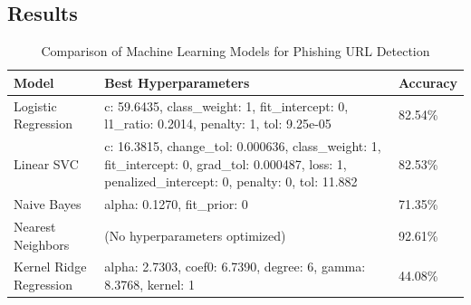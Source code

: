 \documentclass{article}
\begin{document}
    \subsection{Results}\label{subsec:results}


    \begin{table}[H]
        \centering
        \begin{tabular}{|l|p{8cm}|l|}
            \hline
            \textbf{Model}          & \textbf{Best Hyperparameters}                                                                                                                          & \textbf{Accuracy} \\ \hline
            Logistic Regression     & c: 59.6435, class\_weight: 1, fit\_intercept: 0, l1\_ratio: 0.2014, penalty: 1, tol: 9.25e-05 & 82.54\% \\ \hline
            Linear SVC              & c: 16.3815, change\_tol: 0.000636, class\_weight: 1, fit\_intercept: 0, grad\_tol: 0.000487, loss: 1, penalized\_intercept: 0, penalty: 0, tol: 11.882 & 82.53\% \\ \hline
            Naive Bayes             & alpha: 0.1270, fit\_prior: 0                                                                                                                           & 71.35\%           \\ \hline
            Nearest Neighbors       & (No hyperparameters optimized)                                                                                                                         & 92.61\%           \\ \hline %
            Kernel Ridge Regression & alpha: 2.7303, coef0: 6.7390, degree: 6, gamma: 8.3768, kernel: 1 & 44.08\% \\ \hline
        \end{tabular}
        \caption{Comparison of Machine Learning Models for Phishing URL Detection}
        \label{tab:model_comparison}
    \end{table}
\end{document}
